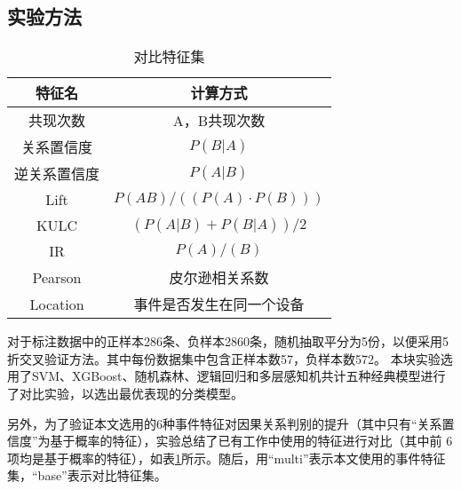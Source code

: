 \subsection{实验方法}
\begin{table}[htbp]
    \caption{对比特征集}
    \centering
    \label{only-prob-feature}
    \begin{tabular}{cc}
    \toprule[1.5pt]
    特征名    & 计算方式                  \\ \midrule[1.5pt]
    共现次数\cite{liu1998integrating}   & A，B共现次数               \\
    关系置信度\cite{liu1998integrating}  & $P(B|A)$                \\
    逆关系置信度\cite{liu1998integrating} & $P(A|B)$                \\
    Lift\cite{liu1998integrating}  & $P(AB)/((P(A) \cdot P(B)))$ \\
    KULC\cite{liu1998integrating}   & $(P(A|B) + P(B|A))/2$   \\
    IR\cite{liu1998integrating}    & $P(A)/(B)$              \\ 
    Pearson\cite{mahimkar2008troubleshooting} & 皮尔逊相关系数         \\
    Location\cite{nie2016mining-causality-graph}  & 事件是否发生在同一个设备 \\ 
    \bottomrule[1.5pt]
    \end{tabular}
\end{table}
对于标注数据中的正样本286条、负样本2860条，随机抽取平分为5份，以便采用5折交叉验证方法。其中每份数据集中包含正样本数57，负样本数572。
本块实验选用了SVM、XGBoost、随机森林、逻辑回归和多层感知机共计五种经典模型进行了对比实验，以选出最优表现的分类模型。

另外，为了验证本文选用的6种事件特征对因果关系判别的提升（其中只有“关系置信度”为基于概率的特征），实验总结了已有工作中使用的特征进行对比（其中前 6 项均是基于概率的特征），如表\ref{only-prob-feature}所示。随后，用“multi”表示本文使用的事件特征集，“base”表示对比特征集。


